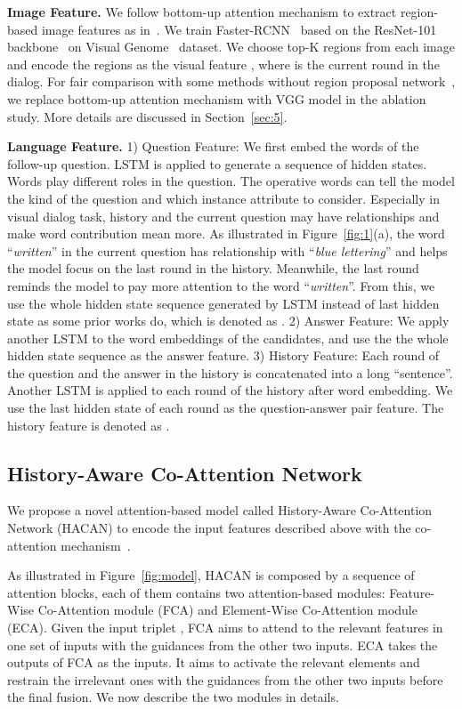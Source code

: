 \documentclass[10pt,twocolumn,letterpaper]{article}
\begin{document}
\noindent\textbf{Image Feature.} We follow bottom-up attention mechanism to extract region-based image features as in~\cite{anderson2017bottom}. 
We train Faster-RCNN~\cite{ren2015faster} based on the ResNet-101 backbone~\cite{he2016deep} on Visual Genome~\cite{krishna2017visual} dataset. We choose top-K regions from each image and encode the regions as the visual feature , where  is the current round in the dialog. For fair comparison with some methods without region proposal network~\cite{ren2015faster}, we replace bottom-up attention mechanism with VGG model in the ablation study. More details are discussed in Section~\ref{sec:5}.


\noindent\textbf{Language Feature.} 1) Question Feature: We first embed the words of the follow-up question.  LSTM is applied to generate a sequence of hidden states. Words play different roles in the question. The operative words can tell the model the kind of the question and which instance attribute to consider. Especially in visual dialog task, history and the current question may have relationships and make word contribution mean more. As illustrated in Figure~\ref{fig:1}(a), the word ``\emph{written}'' in the current question has relationship with ``\emph{blue lettering}'' and helps the model focus on the last round in the history. Meanwhile, the last round reminds the model to pay more attention to the word ``\emph{written}''. From this, we use the whole hidden state sequence generated by LSTM instead of last hidden state as some prior works do, which is denoted as . 2) Answer Feature: We apply another LSTM to the word embeddings of the candidates, and use the the whole hidden state sequence as the answer feature. 3) History Feature: Each round of the question and the answer in the history is concatenated into a long ``sentence''. Another LSTM is applied to each round of the history after word embedding. We use the last hidden state of each round as the question-answer pair feature. The history feature is denoted as .



\subsection{History-Aware Co-Attention Network}\label{sec:3.2}
We propose a novel attention-based model called History-Aware Co-Attention Network (HACAN) to encode the input features described above with the co-attention mechanism~\cite{wu2017you,lu2017best,lu2016hierarchical}. 

As illustrated in Figure~\ref{fig:model}, HACAN is composed by a sequence of attention blocks,  each of them contains two attention-based modules: Feature-Wise Co-Attention module (FCA) and Element-Wise Co-Attention module (ECA). Given the input triplet , FCA aims to attend to the relevant features in one set of inputs with the guidances from the other two inputs. ECA takes the outputs of FCA as the inputs. It aims to activate the relevant elements and restrain the irrelevant ones with the guidances from the other two inputs before the final fusion. We now describe the two modules in details. 
\end{document}
